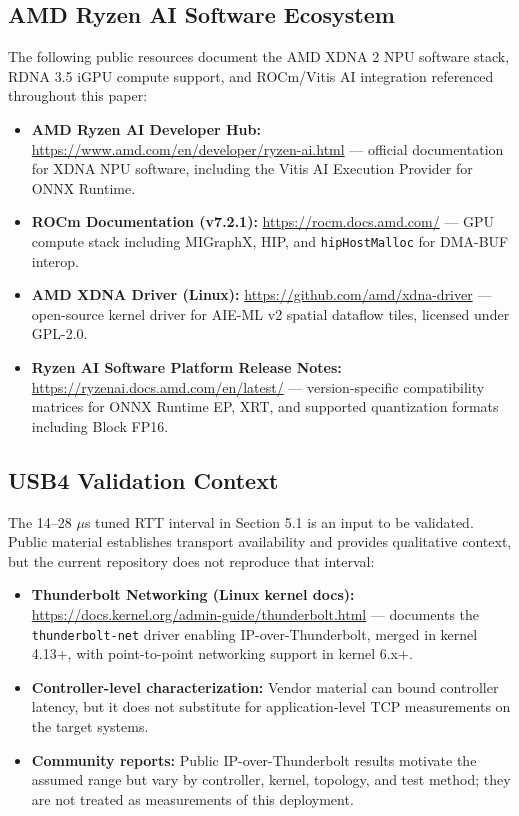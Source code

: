 \documentclass[11pt,a4paper]{article}
\begin{document}
\subsection{AMD Ryzen AI Software Ecosystem}
The following public resources document the AMD XDNA 2 NPU software stack, RDNA 3.5 iGPU compute support, and ROCm/Vitis AI integration referenced throughout this paper:
\begin{itemize}[nosep]
    \item \textbf{AMD Ryzen AI Developer Hub:} \url{https://www.amd.com/en/developer/ryzen-ai.html} --- official documentation for XDNA NPU software, including the Vitis AI Execution Provider for ONNX Runtime.
    \item \textbf{ROCm Documentation (v7.2.1):} \url{https://rocm.docs.amd.com/} --- GPU compute stack including MIGraphX, HIP, and \texttt{hipHostMalloc} for DMA-BUF interop.
    \item \textbf{AMD XDNA Driver (Linux):} \url{https://github.com/amd/xdna-driver} --- open-source kernel driver for AIE-ML v2 spatial dataflow tiles, licensed under GPL-2.0.
    \item \textbf{Ryzen AI Software Platform Release Notes:} \url{https://ryzenai.docs.amd.com/en/latest/} --- version-specific compatibility matrices for ONNX Runtime EP, XRT, and supported quantization formats including Block FP16.
\end{itemize}

\subsection{USB4 Validation Context}
The 14--28 $\mu$s tuned RTT interval in Section 5.1 is an input to be validated. Public material establishes transport availability and provides qualitative context, but the current repository does not reproduce that interval:
\begin{itemize}[nosep]
    \item \textbf{Thunderbolt Networking (Linux kernel docs):} \url{https://docs.kernel.org/admin-guide/thunderbolt.html} --- documents the \texttt{thunderbolt-net} driver enabling IP-over-Thunderbolt, merged in kernel 4.13+, with point-to-point networking support in kernel 6.x+.
    \item \textbf{Controller-level characterization:} Vendor material can bound controller latency, but it does not substitute for application-level TCP measurements on the target systems.
    \item \textbf{Community reports:} Public IP-over-Thunderbolt results motivate the assumed range but vary by controller, kernel, topology, and test method; they are not treated as measurements of this deployment.
\end{itemize}
\end{document}
